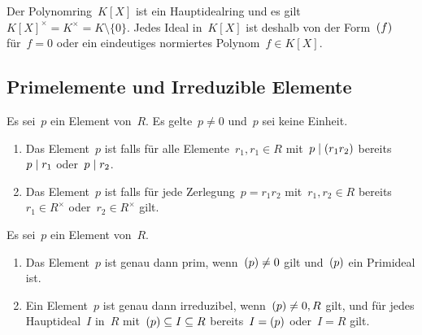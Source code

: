 \begin{example}
  Der Polynomring~$K[X]$ ist ein Hauptidealring und es gilt~$K[X]^\times = K^\times = K \setminus \{0\}$.
  Jedes Ideal in~$K[X]$ ist deshalb von der Form~$(f)$ für~$f = 0$ oder ein eindeutiges normiertes Polynom~$f \in K[X]$.
\end{example}



\subsection{Primelemente und Irreduzible Elemente}

\begin{definition}
  Es sei~$p$ ein Element von~$R$.
  Es gelte~$p \neq 0$ und~$p$ sei keine Einheit.
  \begin{enumerate}
    \item
      Das Element~$p$ ist  falls für alle Elemente~$r_1, r_1 \in R$ mit~$p \mid (r_1 r_2)$ bereits~$p \mid r_1$ oder~$p \mid r_2$.
    \item
      Das Element~$p$ ist  falls für jede Zerlegung~$p = r_1 r_2$ mit~$r_1, r_2 \in R$ bereits~$r_1 \in R^\times$ oder~$r_2 \in R^\times$ gilt.
  \end{enumerate}
\end{definition}


\begin{lemma}
  Es sei~$p$ ein Element von~$R$.
  \begin{enumerate}
    \item
      Das Element~$p$ ist genau dann prim, wenn~$(p) \neq 0$ gilt und~$(p)$ ein Primideal ist.
    \item
      Ein Element~$p$ ist genau dann irreduzibel, wenn~$(p) \neq 0, R$ gilt, und für jedes Hauptideal~$I$ in~$R$ mit~$(p) \subseteq I \subseteq R$ bereits~$I = (p)$ oder~$I = R$ gilt.
  \end{enumerate}
\end{lemma}

